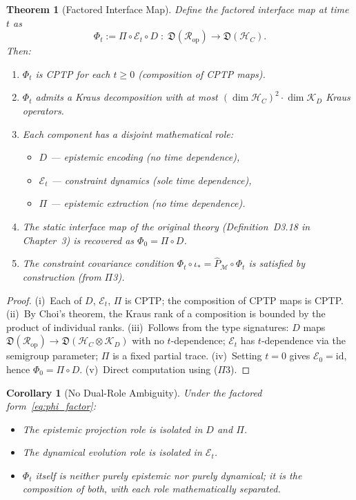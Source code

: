 \documentclass[11pt,a4paper]{article}
\newtheorem{theorem}[definition]{Theorem}
\newtheorem{corollary}[definition]{Corollary}
\theoremstyle{remark}
\newcommand{\CR}{\mathcal{R}}
\newcommand{\CM}{\mathcal{M}}
\newcommand{\HC}{\mathcal{H}_C}
\newcommand{\hatP}{\hat{P}}
\newcommand{\id}{\mathrm{id}}
\begin{document}
\begin{theorem}[Factored Interface Map]
\label{thm:phi_factor}
Define the \emph{factored interface map} at time $t$ as
\begin{equation}
\label{eq:phi_factor}
  \boxed{
    \Phi_t := \Pi \circ \mathcal{E}_t \circ D
    \;:\;
    \mathfrak{D}(\CR_{\mathrm{op}})
    \longrightarrow
    \mathfrak{D}(\HC).
  }
\end{equation}
Then:
\begin{enumerate}[label=(\roman*)]
  \item $\Phi_t$ is CPTP for each $t \geq 0$ (composition of CPTP maps).
  \item $\Phi_t$ admits a Kraus decomposition with at most
    $(\dim\HC)^2 \cdot \dim\mathcal{K}_D$ Kraus operators.
  \item Each component has a disjoint mathematical role:
    \begin{itemize}
      \item $D$ --- epistemic encoding (no time dependence),
      \item $\mathcal{E}_t$ --- constraint dynamics (sole time
        dependence),
      \item $\Pi$ --- epistemic extraction (no time dependence).
    \end{itemize}
  \item The static interface map of the original theory
    (Definition~D3.18 in Chapter~3) is recovered as $\Phi_0 = \Pi \circ D$.
  \item The constraint covariance condition
    $\Phi_t \circ \iota_* = \hatP_\CM \circ \Phi_t$ is satisfied by
    construction (from $\Pi$3).
\end{enumerate}
\end{theorem}

\begin{proof}
(i)~Each of $D$, $\mathcal{E}_t$, $\Pi$ is CPTP; the composition of
CPTP maps is CPTP.  (ii)~By Choi's theorem, the Kraus rank of a
composition is bounded by the product of individual ranks.
(iii)~Follows from the type signatures: $D$ maps
$\mathfrak{D}(\CR_{\mathrm{op}}) \to
\mathfrak{D}(\HC \otimes \mathcal{K}_D)$ with no $t$-dependence;
$\mathcal{E}_t$ has $t$-dependence via the semigroup parameter;
$\Pi$ is a fixed partial trace.  (iv)~Setting $t=0$ gives
$\mathcal{E}_0 = \id$, hence $\Phi_0 = \Pi \circ D$.  (v)~Direct
computation using ($\Pi$3).
\end{proof}

\begin{corollary}[No Dual-Role Ambiguity]
\label{cor:no_dual}
Under the factored form~\eqref{eq:phi_factor}:
\begin{itemize}
  \item The epistemic projection role is isolated in $D$ and $\Pi$.
  \item The dynamical evolution role is isolated in $\mathcal{E}_t$.
  \item $\Phi_t$ itself is \emph{neither} purely epistemic \emph{nor}
    purely dynamical; it is the composition of both, with each role
    mathematically separated.
\end{itemize}
\end{corollary}
\end{document}
